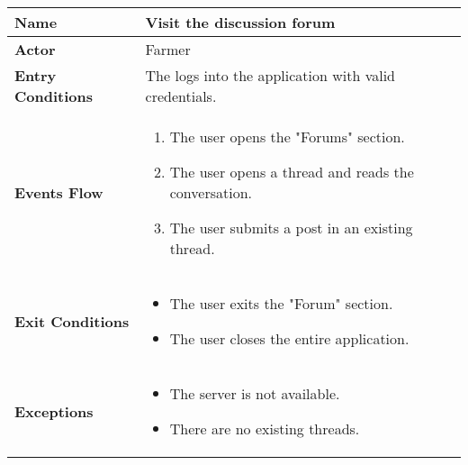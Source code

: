 \begin{center}
\renewcommand{\arraystretch}{1.25}
\begin{tabular}{|l|>{\raggedright\arraybackslash}m{12cm}|}

    \hline
    \textbf{Name} & Visit the discussion forum\\
    \hline
   	\textbf{Actor} & Farmer\\
    \hline
    \textbf{Entry Conditions} & The logs into the application with valid credentials.\\
    \hline
    \textbf{Events Flow} & 
    		\begin{enumerate}
    			\item The user opens the "Forums" section.
    			\item The user opens a thread and reads the conversation.
    			\item The user submits a post in an existing thread.
    		\end{enumerate}
    	\\
    \hline
    \textbf{Exit Conditions} & \begin{itemize}
    	\item The user exits the "Forum" section.
    	\item The user closes the entire application.\end{itemize}\\
    \hline
    \textbf{Exceptions} & 
    		\begin{itemize}
    			\item The server is not available.
    			\item There are no existing threads.
    		\end{itemize}
    	\\
    \hline
\end{tabular}
\end{center}